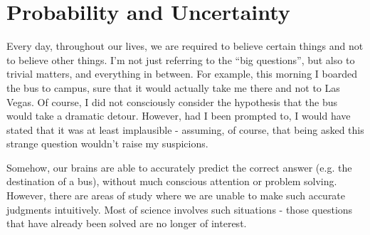 \chapter{Probability and Uncertainty}

Every day, throughout our lives, we are required 
to believe certain things and not to believe other things. I'm not just 
referring to the ``big questions'', but also to trivial matters, and 
everything in between. For example, this morning I boarded the bus to 
campus, sure that it would actually take me there and not to Las Vegas. 
Of course, I did not consciously consider the hypothesis that the bus 
would take a dramatic detour. However, had I been prompted to, I would 
have stated that it was at least implausible - assuming, of course, that 
being asked this strange question wouldn't raise my suspicions.

Somehow, our brains are able to accurately predict the correct answer
(e.g. the destination of a bus), without much conscious attention or
problem solving. However, there are areas of study where we are unable
to make such accurate judgments intuitively. Most of science involves
such situations - those questions that have already been solved are
no longer of interest.
